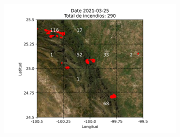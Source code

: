 \begin{figure}[H]
\begin{subfigure}{0.23\textwidth}
        \includegraphics[width=1\linewidth]{Graphics/2021-03-25.png}
        \caption*{}
    \end{subfigure}
\end{figure}
